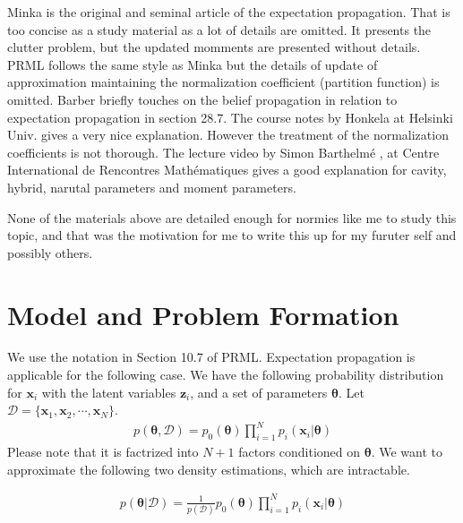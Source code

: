 \documentclass[a4]{article}
\begin{document}
Minka \cite{minka2001} is the original and seminal article of the expectation propagation.
That is too concise as a study material as a lot of details are omitted. It presents
the clutter problem, but the updated momments are presented without details.
PRML \cite{bishop2007} follows the same style as Minka \cite{minka2001} but
the details of update of approximation maintaining the normalization coefficient (partition function)
is omitted.
Barber \cite{Barber2011} briefly touches on the belief propagation in relation to expectation propagation
in section 28.7.
The course notes \cite{Honkela} by Honkela at Helsinki Univ. gives a very nice explanation.
However the treatment of the normalization coefficients is not thorough.
The lecture video by Simon Barthelm\'{e} \cite{Barthelme},
at Centre International de Rencontres Math\'{e}matiques gives a good explanation for cavity, hybrid,
narutal parameters and moment parameters.

None of the materials above are detailed enough for normies like me to study this topic, and that
was the motivation for me to write this up for my furuter self and possibly others.

\section{Model and Problem Formation}
We use the notation in Section 10.7 of PRML\cite{bishop2007}.
Expectation propagation is applicable for the following case.
We have the following probability distribution for $\bm{x}_i$ 
with the latent variables $\bm{z}_i$, and a set of parameters $\bm{\theta}$.
Let $\mathcal{D} = \{\bm{x}_1, \bm{x}_2, \cdots, \bm{x}_N \}$.
\begin{equation}
\begin{aligned}
p(\bm{\theta}, \mathcal{D}) = p_0(\bm{\theta})\prod_{i=1}^{N}p_i(\bm{x}_i|\bm{\theta})
\end{aligned}
\end{equation}
Please note that it is factrized into $N + 1$ factors conditioned on $\bm{\theta}$.
We want to approximate the following two density estimations, which are intractable.

\begin{equation}
\begin{aligned}
p(\bm{\theta} | \mathcal{D}) = \frac{1}{p(\mathcal{D})}p_0(\bm{\theta})\prod_{i=1}^{N}p_i(\bm{x}_i|\bm{\theta})
\end{aligned}
\end{equation}
\end{document}
